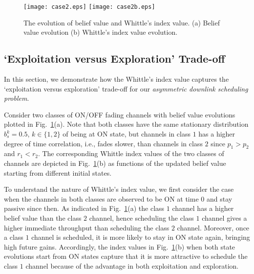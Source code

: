 \documentclass[11pt,twocolumn]{IEEEtran}
\begin{document}
\begin{figure}
\centering
\texttt{[image: case2.eps]}
\texttt{[image: case2b.eps]}
\vspace{-3pt} \caption{The evolution of belief value and Whittle's
index value. (a)
Belief value evolution (b) Whittle's index value evolution. }
\vspace{-15pt}
\label{fig:beliefindex}
\end{figure}







\subsection{`Exploitation versus Exploration' Trade-off}
\label{sec:num:trade-off}

\vspace{-3pt}In this section, we demonstrate how the Whittle's index value captures
the `exploitation versus exploration' trade-off for our \emph{asymmetric
downlink scheduling problem}.

Consider two classes of ON/OFF fading channels with belief value
evolutions plotted in Fig.~\ref{fig:beliefindex}(a). Note that
both classes have the same stationary distribution $b^k_s=0.5$,
$k\in \{1,2\}$ of being at ON state, but channels in class $1$ has a higher
degree of time correlation, i.e., fades slower, than channels in
class $2$ since $p_1 > p_2$ and $r_1<r_2$. The corresponding Whittle
index values of the two classes of channels are depicted in
Fig.~\ref{fig:beliefindex}(b) as functions of the updated belief
value starting from different initial states.

To understand the nature of Whittle's index value, we first consider
the case when the channels in both classes are observed to be ON at
time $0$ and stay passive since then. As indicated in
Fig.~\ref{fig:beliefindex}(a) the class $1$ channel has a higher
belief value than the class $2$ channel, hence scheduling the
class $1$ channel gives a higher immediate throughput than
scheduling the class $2$ channel. Moreover, once a class $1$ channel
is scheduled, it is more likely to stay in ON state again,
bringing high future gains. Accordingly, the index values in
Fig.~\ref{fig:beliefindex}(b) when both state evolutions start from
ON states capture that it is more attractive to schedule the
class $1$ channel because of the advantage in both exploitation and
exploration.
\end{document}
